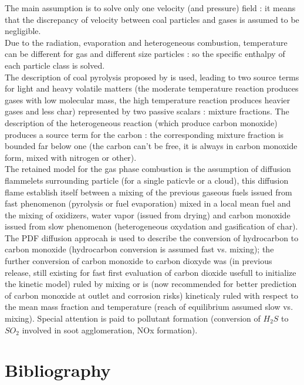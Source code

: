 The main assumption is to solve only one velocity (and pressure) field : it
means that the discrepancy of velocity between coal particles and
gases is assumed to be negligible.\\
Due to the radiation, evaporation and heterogeneous combustion, temperature can
be different for gas and different size particles : so the specific enthalpy of
each particle class is solved.\\
The description of coal pyrolysis proposed by \cite{4} is used, leading to two
source terms for light and heavy volatile matters (the moderate temperature
reaction produces gases with low molecular mass, the high temperature reaction
produces heavier gases and less char) represented by two passive scalars :
mixture fractions.  The description of the heterogeneous reaction (which produce
carbon monoxide) produces a source term for the carbon : the corresponding
mixture fraction is bounded far below one (the carbon can't be free, it is
always in carbon monoxide form, mixed with nitrogen or other).\\
The retained model for the gas phase combustion is the assumption of diffusion
flammelets surrounding particle (for a single paticvle or a cloud), this
diffusion flame establish itself between a mixing of the previous gaseous fuels
issued from fast phenomenon (pyrolysis or fuel evaporation) mixed in a local
mean fuel and the mixing of oxidizers, water vapor (issued from drying) and
carbon monoxide issued from slow phenomenon (heterogeneous oxydation and
gasification of char). The PDF diffusion approcah is used to describe the
conversion of hydrocarbon to carbon monoxide (hydrocarbon conversion is assumed
fast vs. mixing); the further conversion of carbon monoxide to carbon dioxyde
was (in previous release, still existing for fast first evaluation of carbon
dioxide usefull to initialize the kinetic model) ruled by mixing or is (now
recommended for better prediction of carbon monoxide at outlet and corrosion
risks) kineticaly ruled with respect to the mean mass fraction and temperature
(reach of equilibrium assumed slow vs. mixing). Special attention is paid to
pollutant formation (conversion of $H_{2}S$ to $SO_{2}$ involved in soot
agglomeration, NOx formation).

\section*{Bibliography}

